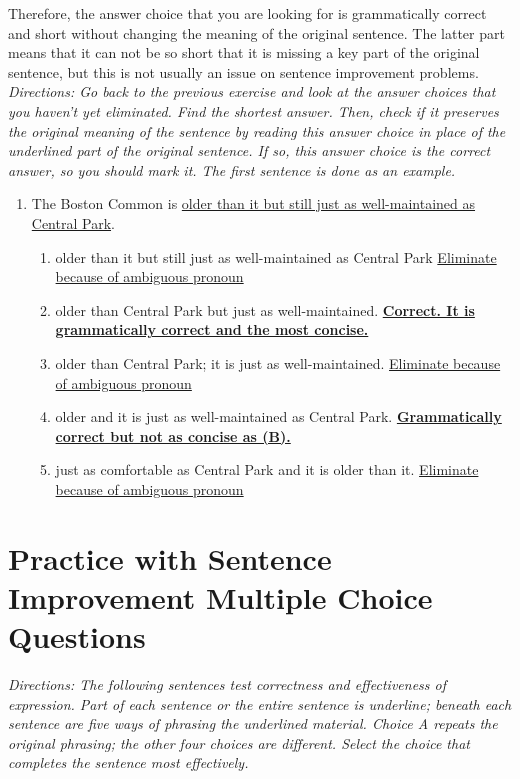 \documentclass[12pt]{book}
\begin{document}
\begin{enumerate}
Therefore, the answer choice that you are looking for is grammatically correct and short without changing the meaning of the original sentence. The latter part means that it can not be so short that it is missing a key part of the original sentence,
but this is not usually an issue on sentence improvement problems. \\

\textit{Directions: Go back to the previous exercise and look at the answer choices that you haven't yet eliminated. Find the shortest answer. Then, check if it preserves the original meaning of the sentence by reading this answer choice in place of the underlined part of the original sentence. If so, this answer choice is the correct answer, so you should mark it. The first sentence is done as an example.}

\begin{enumerate}
\item The Boston Common is \ul{ older than it but still just as well-maintained as Central Park}.
\begin{enumerate}[label=(\Alph*)]

\item older than it but still just as well-maintained as Central Park  \ul{Eliminate because of ambiguous pronoun}
\item older than Central Park but just as well-maintained. \textbf{\ul{Correct. It is grammatically correct and the most concise. }}
\item  older than Central Park; it is just as well-maintained.    \ul{Eliminate because of ambiguous pronoun}
\item older and it is just as well-maintained as Central Park. \textbf{\ul{Grammatically correct but not as concise as (B).}}
\item just as comfortable as Central Park and it is older than it. \ul{Eliminate because of ambiguous pronoun}

\end{enumerate}

\end{enumerate}

\newpage

\section[Sentence Improvement]{Practice with Sentence Improvement Multiple Choice Questions}
\textit{Directions: The following sentences test correctness and effectiveness of expression. Part of each sentence or the entire sentence is underline; beneath each sentence are five ways of phrasing the underlined material. Choice A repeats the original phrasing; the other four choices are different. Select the choice that completes the sentence most effectively. }


\end{enumerate}
\end{document}
